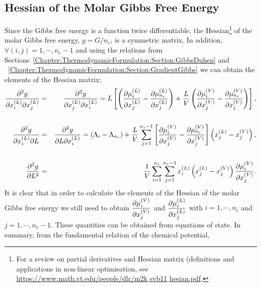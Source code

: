 \subsection{Hessian of the Molar Gibbs Free Energy}\label{Chapter:ThermodynamicFormulation:Section:HessianGibbs}
Since the Gibbs free energy is a function twice differentiable, the Hessian\footnote{For a review on partial derivatives and Hessian matrix (definitions and applications in non-linear optimisation, see \href{https://www.math.vt.edu/people/dlr/m2k_svb11_hesian.pdf}{https://www.math.vt.edu/people/dlr/m2k$\_$svb11$\_$hesian.pdf}.} of the molar Gibbs free energy, $g=G/n_{c}$, is a symmetric matrix. In addition, $\forall (i,j)=1, \cdots, n_{c}-1$ and using the relations from Sections~\ref{Chapter:ThermodynamicFormulation:Section:GibbsDuhen} and ~\ref{Chapter:ThermodynamicFormulation:Section:GradientGibbs} we can obtain the elements of the Hessian matrix:
\begin{eqnarray}
   \frc{\partial^{2}g}{\partial\mfr[x]{i}{L}\partial\mfr[x]{j}{L}} &=& \frc{\partial^{2}g}{\partial\mfr[x]{j}{L}\partial\mfr[x]{i}{L}} = L\left[\left(\frc{\partial\mfr[\mu]{i}{L}}{\partial\mfr[x]{j}{L}} - \frc{\partial\mfr[\mu]{n_{c}}{L}}{\partial\mfr[x]{j}{L}}\right) + \frc{L}{V}\left(\frc{\partial\mfr[\mu]{i}{V}}{\partial\mfr[x]{j}{V}} - \frc{\partial\mfr[\mu]{n_{c}}{V}}{\partial\mfr[x]{j}{V}}\right)\right], \\
              && \nonumber \\
   \frc{\partial^{2}g}{\partial\mfr[x]{i}{L}\partial L} &=& \frc{\partial^{2}g}{\partial L\partial\mfr[x]{i}{L}} = \left(\Lambda_{i}-\Lambda_{n_{c}}\right) + \frc{L}{V} \summation_{j=1}^{n_{c}-1}\left[\frc{\partial\mfr[\mu]{i}{V}}{\partial\mfr[x]{j}{V}} - \frc{\partial\mfr[\mu]{n_{c}}{V}}{\partial\mfr[x]{j}{V}}\right]\left(\mfr[x]{j}{L}-\mfr[x]{j}{V}\right), \\
              && \nonumber \\
    \frc{\partial^{2}g}{\partial L^{2}} &=& \frc{1}{V}\summation_{i=1}^{n_{c}}\summation_{j=1}^{n_{c}-1}\mfr[x]{i}{L}\left(\mfr[x]{j}{L}-\mfr[x]{j}{V}\right)\frc{\partial\mfr[\mu]{i}{V}}{\partial\mfr[x]{j}{V}}.
\end{eqnarray}
It is clear that in order to calculate the elements of the Hessian of the molar Gibbs free energy we still need to obtain $\frc{\partial\mfr[\mu]{i}{V}}{\partial\mfr[x]{j}{V}}$ and $\frc{\partial\mfr[\mu]{i}{L}}{\partial\mfr[x]{j}{L}}$ with $i=1, \cdots, n_{c}$ and $j=1, \cdots, n_{c}-1$. These quantities can be obtained from equations of state. In summary, from the fundamental relation of the chemical potential,
